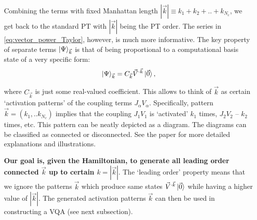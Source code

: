 \documentclass[10pt, a4paper]{article}
\begin{document}
Combining the terms with fixed Manhattan length $|\vec{k}|\equiv k_1+k_2+..+k_{N_c}$, we get back to the standard PT with $|\vec{k}|$ being the PT order. The series in \eqref{eq:vector_power_Taylor}, however, is much more informative. The key property of separate terms $\ket{\Psi}_{\vec{k}}$ is that of being proportional to a computational basis state of a very specific form:
\begin{equation}
\ket{\Psi}_{\vec{k}}=C_{\vec{k}}\vec{V}^{\cdot\vec{k}}\ket{\vec{0}},
\end{equation}

where $C_{\vec{k}}$ is just some real-valued coefficient. This allows to think of $\vec{k}$ as certain `activation patterns' of the coupling terms $J_\alpha V_\alpha$. Specifically, pattern $\vec{k}=(k_1,..k_{N_c})$ implies that the coupling $J_1V_1$ is `activated' $k_1$ times, $J_2V_2$ -- $k_2$ times, etc. This pattern can be neatly depicted as a diagram. The diagrams can be classified as connected or disconnected. See the paper for more detailed explanations and illustrations.

\textbf{Our goal is, given the Hamiltonian, to generate all leading order connected $\vec{k}$ up to certain $k=|\vec{k}|$}. The `leading order' property means that we ignore the patterns $\vec{k}$ which produce same states $\vec{V}^{\cdot\vec{k}}\ket{\vec{0}}$ while having a higher value of $|\vec{k}|$. The generated activation patterns $\vec{k}$ can then be used in constructing a VQA (see next subsection).
\end{document}
